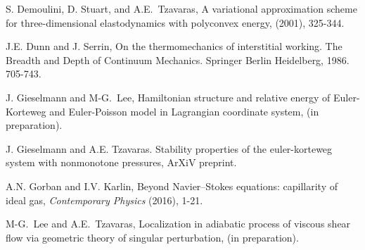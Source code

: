 \documentclass[a4paper,11pt]{article}
\begin{document}
\begin{thebibliography}{10}
\hrulefill

S. Demoulini, D. Stuart, and A.E.~Tzavaras,
\newblock A variational approximation scheme for three-dimensional
  elastodynamics with polyconvex energy,
 (2001), 325-344.

J.E. Dunn and J. Serrin, On the thermomechanics of interstitial working. The Breadth and Depth of Continuum Mechanics. Springer Berlin Heidelberg, 1986. 705-743.


{\sc J. Gieselmann and M-G.~Lee},
Hamiltonian structure and relative energy of Euler-Korteweg and Euler-Poisson model in Lagrangian coordinate system, (in preparation).

J. Gieselmann and A.E. Tzavaras.
\newblock Stability properties of the euler-korteweg system
with nonmonotone pressures,
\newblock ArXiV preprint.

A.N. Gorban and I.V. Karlin, Beyond Navier–Stokes equations: capillarity of ideal gas, {\it Contemporary Physics} (2016), 1-21.

{\sc M-G.~Lee and A.E.~Tzavaras},
Localization in adiabatic process of viscous shear flow via geometric theory of singular perturbation, (in preparation).


% 




\end{thebibliography}
\end{document}
